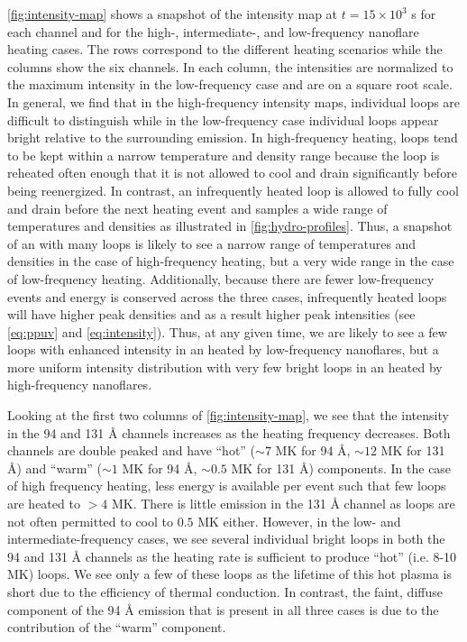 \autoref{fig:intensity-map} shows a snapshot of the intensity map at $t=15\times10^3$ s for each channel and for the high-, intermediate-, and low-frequency nanoflare heating cases. The rows correspond to the different heating scenarios while the columns show the six channels. In each column, the intensities are normalized to the maximum intensity in the low-frequency case and are on a square root scale. In general, we find that in the high-frequency intensity maps, individual loops are difficult to distinguish while in the low-frequency case individual loops appear bright relative to the surrounding emission. In high-frequency heating, loops tend to be kept within a narrow temperature and density range because the loop is reheated often enough that it is not allowed to cool and drain significantly before being reenergized. In contrast, an infrequently heated loop is allowed to fully cool and drain before the next heating event and samples a wide range of temperatures and densities as illustrated in \autoref{fig:hydro-profiles}. Thus, a snapshot of an \AR{} with many loops is likely to see a narrow range of temperatures and densities in the case of high-frequency heating, but a very wide range in the case of low-frequency heating. Additionally, because there are fewer low-frequency events and energy is conserved across the three cases, infrequently heated loops will have higher peak densities and as a result higher peak intensities (see \autoref{eq:ppuv} and \ref{eq:intensity}). Thus, at any given time, we are likely to see a few loops with enhanced intensity in an \AR{} heated by low-frequency nanoflares, but a more uniform intensity distribution with very few bright loops in an \AR{} heated by high-frequency nanoflares.

Looking at the first two columns of \autoref{fig:intensity-map}, we see that the intensity in the 94 and 131 \AA{} channels increases as the heating frequency decreases. Both channels are double peaked and have ``hot'' ($\sim7$ MK for 94 \AA{}, $\sim12$ MK for 131 \AA{}) and ``warm'' ($\sim1$ MK for 94 \AA{}, $\sim0.5$ MK for 131 \AA{}) components. In the case of high frequency heating, less energy is available per event such that few loops are heated to $>4$ MK. There is little emission in the 131 \AA{} channel as loops are not often permitted to cool to $0.5$ MK either. However, in the low- and intermediate-frequency cases, we see several individual bright loops in both the 94 and 131 \AA{} channels as the heating rate is sufficient to produce ``hot'' (i.e. 8-10 MK) loops. We see only a few of these loops as the lifetime of this hot plasma is short due to the efficiency of thermal conduction. In contrast, the faint, diffuse component of the 94 \AA{} emission that is present in all three cases is due to the contribution of the ``warm'' component. 

